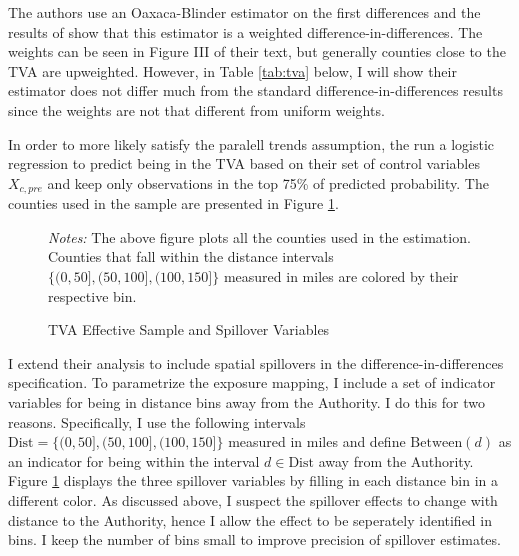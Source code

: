 \documentclass[11pt]{article}
\begin{document}
The authors use an Oaxaca-Blinder estimator on the first differences and the results of \citet{Kline_2011} show that this estimator is a weighted difference-in-differences. The weights can be seen in Figure III of their text, but generally counties close to the TVA are upweighted. However, in Table \ref{tab:tva} below, I will show their estimator does not differ much from the standard difference-in-differences results since the weights are not that different from uniform weights. 

In order to more likely satisfy the paralell trends assumption, the run a logistic regression to predict being in the TVA based on their set of control variables $X_{c, pre}$ and keep only observations in the top 75\% of predicted probability. The counties used in the sample are presented in Figure \ref{fig:tva_sample}. 

\begin{figure}[tb!]
    \caption{TVA Effective Sample and Spillover Variables}
    \label{fig:tva_sample}

    {\centering
    }

    {\footnotesize \textit{Notes:} The above figure plots all the counties used in the estimation. Counties that fall within the distance intervals $\{(0, 50], (50, 100], (100, 150]\}$ measured in miles are colored by their respective bin.}
\end{figure}

I extend their analysis to include spatial spillovers in the difference-in-differences specification. To parametrize the exposure mapping, I include a set of indicator variables for being in distance bins away from the Authority. I do this for two reasons. Specifically, I use the following intervals $\text{Dist} = \{(0, 50], (50, 100], (100, 150]\}$ measured in miles and define $\text{Between}(d)$ as an indicator for being within the interval $d \in \text{Dist}$ away from the Authority. Figure \ref{fig:tva_sample} displays the three spillover variables by filling in each distance bin in a different color. As discussed above, I suspect the spillover effects to change with distance to the Authority, hence I allow the effect to be seperately identified in bins. I keep the number of bins small to improve precision of spillover estimates. 
\end{document}
